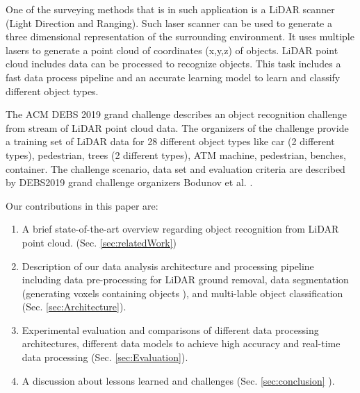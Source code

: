 \documentclass[sigconf]{acmart}
\begin{document}
One of the surveying methods that is in such application is a LiDAR scanner (Light Direction and Ranging). Such laser scanner can be used to generate a three dimensional representation of the surrounding environment. 
It uses multiple lasers to generate a point cloud of coordinates (x,y,z) of objects. 
LiDAR point cloud includes data can be processed to recognize objects. This task includes a fast data process pipeline and an accurate learning model to learn and classify different object types. 

The ACM DEBS 2019 grand challenge \cite{DEBSGC2019} describes an object recognition challenge from stream of LiDAR point cloud data. 
The organizers of the challenge provide a training set of LiDAR data for 28 different object types like car (2 different types), pedestrian, trees (2 different types), ATM machine, pedestrian, benches, container. The challenge scenario, data set and evaluation criteria are described by DEBS2019 grand challenge organizers  Bodunov et al. \cite{DEBSGC2019}. 


Our contributions in this paper are: 


\begin{enumerate}
  \item A brief state-of-the-art overview regarding object recognition from LiDAR point cloud.  (Sec. \ref{sec:relatedWork})
  \item Description of our data analysis architecture and processing pipeline including data pre-processing for LiDAR ground removal, data segmentation (generating voxels containing objects ), and multi-lable object classification  (Sec.  \ref{sec:Architecture}).
  \item Experimental evaluation and comparisons of different data processing architectures, different data models to achieve high accuracy 
  and real-time data processing (Sec. \ref{sec:Evaluation}).  
  \item A discussion about lessons learned and challenges (Sec. \ref{sec:conclusion} ). 
\end{enumerate}    

  



  























\end{document}
